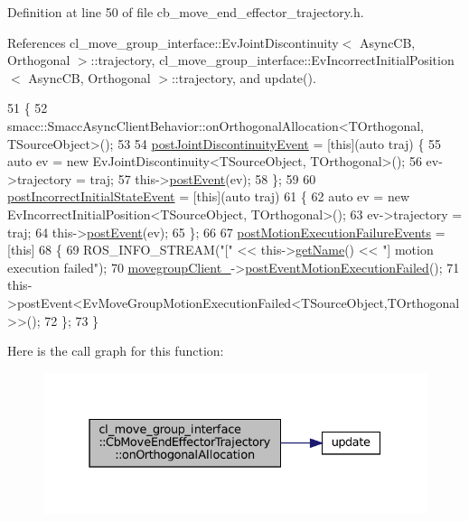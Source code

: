 Definition at line 50 of file cb\+\_\+move\+\_\+end\+\_\+effector\+\_\+trajectory.\+h.



References cl\+\_\+move\+\_\+group\+\_\+interface\+::\+Ev\+Joint\+Discontinuity$<$ Async\+C\+B, Orthogonal $>$\+::trajectory, cl\+\_\+move\+\_\+group\+\_\+interface\+::\+Ev\+Incorrect\+Initial\+Position$<$ Async\+C\+B, Orthogonal $>$\+::trajectory, and update().


\begin{DoxyCode}
51     \{
52       smacc::SmaccAsyncClientBehavior::onOrthogonalAllocation<TOrthogonal, TSourceObject>();
53 
54       \hyperlink{classcl__move__group__interface_1_1CbMoveEndEffectorTrajectory_a308331beab9b2ec0eae72fa56fa999c9}{postJointDiscontinuityEvent} = [\textcolor{keyword}{this}](\textcolor{keyword}{auto} traj) \{
55         \textcolor{keyword}{auto} ev = \textcolor{keyword}{new} EvJointDiscontinuity<TSourceObject, TOrthogonal>();
56         ev->trajectory = traj;
57         this->\hyperlink{classsmacc_1_1ISmaccClientBehavior_a5db577c585935114058770f2b7242f8a}{postEvent}(ev);
58       \};
59 
60       \hyperlink{classcl__move__group__interface_1_1CbMoveEndEffectorTrajectory_a6180230347c922fa0d85f514ce5029df}{postIncorrectInitialStateEvent} = [\textcolor{keyword}{this}](\textcolor{keyword}{auto} traj) 
61       \{
62         \textcolor{keyword}{auto} ev = \textcolor{keyword}{new} EvIncorrectInitialPosition<TSourceObject, TOrthogonal>();
63         ev->trajectory = traj;
64         this->\hyperlink{classsmacc_1_1ISmaccClientBehavior_a5db577c585935114058770f2b7242f8a}{postEvent}(ev);
65       \};
66 
67       \hyperlink{classcl__move__group__interface_1_1CbMoveEndEffectorTrajectory_a72c4a469b70617dc5ea75e225a013582}{postMotionExecutionFailureEvents} = [\textcolor{keyword}{this}]
68       \{
69           ROS\_INFO\_STREAM(\textcolor{stringliteral}{"["} << this->\hyperlink{classsmacc_1_1ISmaccClientBehavior_a18e4bec9460b010f2894c0f7e7064a34}{getName}() << \textcolor{stringliteral}{"] motion execution failed"});
70           \hyperlink{classcl__move__group__interface_1_1CbMoveEndEffectorTrajectory_aea650d3e7836125b32be97392b71a7f3}{movegroupClient\_}->\hyperlink{classcl__move__group__interface_1_1ClMoveGroup_a39dc3871d29b2af1ab739057f6ca6daa}{postEventMotionExecutionFailed}();
71           this->postEvent<EvMoveGroupMotionExecutionFailed<TSourceObject,TOrthogonal>>();
72       \};
73     \}    
\end{DoxyCode}
Here is the call graph for this function\+:
\nopagebreak
\begin{figure}[H]
\begin{center}
\leavevmode
\includegraphics[width=331pt]{classcl__move__group__interface_1_1CbMoveEndEffectorTrajectory_aae4797fba54cb3bf371cc67d26a82186_cgraph}
\end{center}
\end{figure}
